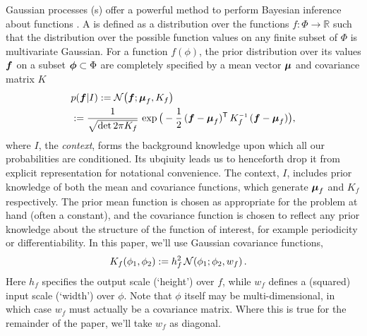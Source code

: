 \documentclass{article}
\begin{document}
Gaussian processes (\gp s) offer a powerful method to perform Bayesian
inference about functions \citep{GPsBook}. A \gpb is defined as a
distribution over the functions $f: \Phi \rightarrow \mathbb{R}$ such
that the distribution over the possible function values on any finite
subset of $\Phi$ is multivariate Gaussian.  For a function $f(\phi)$,
the prior distribution over its values $\vf$ on a subset
$\vph \subset \Phi$ are completely specified by a mean vector
$\vmu$ and covariance matrix $K$
\begin{align*}%
\textstyle
 &\p{\vf}{I} \deq \N{\vf}{\vmu_{f}}{K_{f}}\\
 &\deq\frac{1}{\sqrt{\det{2\pi K_{f}}}}\,\exp \big(-\frac{1}{2}\,(\vf-\vmu_{f})\tra\,K_{f}\inv\,(\vf-\vmu_{f})\big),
\end{align*}
where $I$, the \emph{context}, forms the background knowledge upon which all our probabilities are conditioned. Its ubqiuity leads us to henceforth drop it from explicit representation for notational convenience. The context, $I$, includes prior knowledge of both the
mean and covariance functions, which generate $\vmu_{f}$ and
$K_{f}$ respectively. The prior mean function is chosen as
appropriate for the problem at hand (often a constant), and the
covariance function is chosen to reflect any prior knowledge about the
structure of the function of interest, for example periodicity or
differentiability. In this paper, we'll use Gaussian
covariance functions,
\begin{align} \label{eq:Gaussian_cov_fn}
\textstyle
K_{f}(\phi_1,\phi_2)& \deq h_f^2\,\N{\phi_1}{\phi_2}{w_{f}}.
\end{align} 
Here $h_f$ specifies the output scale (`height') over $f$, while $w_f$ defines a (squared) input scale (`width') over $\phi$. Note that $\phi$ itself may be multi-dimensional, in which case $w_f$ must actually be a covariance matrix. Where this is true for the remainder of the paper, we'll take $w_f$ as diagonal. 
\end{document}
